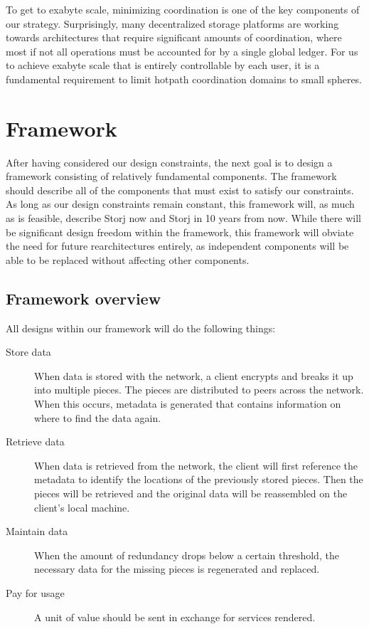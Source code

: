 \documentclass[11pt,fleqn,openany]{book}
\begin{document}
To get to exabyte scale, minimizing coordination is one of the key components
of our strategy.
Surprisingly, many decentralized storage platforms are working towards
architectures that require significant amounts of coordination,
where most if not all operations must be accounted for by a single global
ledger. For us to achieve exabyte scale that is entirely controllable by each user, it is a fundamental requirement to limit hotpath coordination domains to small spheres.

\chapter{Framework}\label{chap:framework}

After having considered our design constraints, the next goal is to design
a framework consisting of relatively fundamental components.
The framework should describe
all of the components that must exist to satisfy our constraints.
As long as our design constraints remain constant, this framework will, as
much as is feasible, describe Storj now and Storj in 10 years from now.
While there will be significant design freedom within the framework,
this framework will obviate the need for future rearchitectures entirely, as
independent components will be able to be replaced without affecting other
components.

\section{Framework overview}

All designs within our framework will do the following things:

\begin{description}

\item[Store data] When data is stored with the network, a client encrypts
and breaks it up into multiple pieces. The pieces are distributed
to peers across the network. When this occurs, metadata is generated that
contains information on where to find the data again.

\item[Retrieve data] When data is retrieved from the network,
the client will first reference the metadata to identify the locations of the
previously stored pieces.
Then the pieces will be retrieved and the original data will be reassembled
on the client's local machine.

\item[Maintain data] When the amount of redundancy drops below a certain
threshold, the necessary data for the missing pieces is regenerated and
replaced.

\item[Pay for usage] A unit of value should be sent in exchange for
services rendered.

\end{description}
\end{document}
